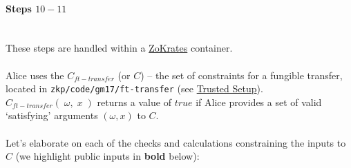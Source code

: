 \documentclass{article}
\begin{document}
\paragraph{Steps $10 - 11$}
\ \\
These steps are handled within a \hyperref[sec:zokrates]{ZoKrates} container.\\
\\
Alice uses the $C_{ft-transfer}$ (or $C$) -- the set of constraints for a fungible transfer, located in \texttt{zkp/code/gm17/ft-transfer} (see \hyperref[sec:trustedSetup]{Trusted Setup}). $C_{ft-transfer}(\;\omega,\;x\;)$ returns a value of $true$ if Alice provides a set of valid `satisfying' arguments $(\omega, x)$ to $C$.\\
\\
Let's elaborate on each of the checks and calculations constraining the inputs to $C$ (we highlight public inputs in \textbf{bold} below):
\end{document}
